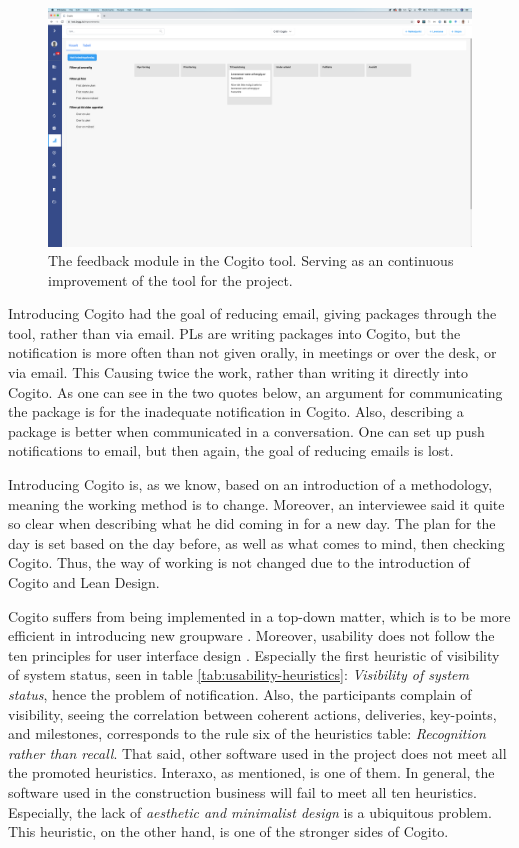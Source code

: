 \begin{figure}
    \centering
    \includegraphics[width=\textwidth]{fig/cogitos_feedback.png}
    \caption{The feedback module in the Cogito tool. Serving as an continuous improvement of the tool for the project.}
    \label{fig:cogito_feedback}
\end{figure}

Introducing Cogito had the goal of reducing email, giving packages through the tool, rather than via email. PLs are writing packages into Cogito, but the notification is more often than not given orally, in meetings or over the desk, or via email. This Causing twice the work, rather than writing it directly into Cogito. As one can see in the two quotes below, an argument for communicating the package is for the inadequate notification in Cogito. Also, describing a package is better when communicated in a conversation. One can set up push notifications to email, but then again, the goal of reducing emails is lost. 

Introducing Cogito is, as we know, based on an introduction of a methodology, meaning the working method is to change. Moreover, an interviewee said it quite so clear when describing what he did coming in for a new day. The plan for the day is set based on the day before, as well as what comes to mind, then checking Cogito. Thus, the way of working is not changed due to the introduction of Cogito and Lean Design.

Cogito suffers from being implemented in a top-down matter, which is to be more efficient in introducing new groupware \citep{Robey&Sahay}. Moreover, usability does not follow the ten principles for user interface design \citep{nielsen199510}. Especially the first heuristic of visibility of system status, seen in table \ref{tab:usability-heuristics}: \textit{Visibility of system status}, hence the problem of notification. Also, the participants complain of visibility, seeing the correlation between coherent actions, deliveries, key-points, and milestones, corresponds to the rule six of the heuristics table: \textit{Recognition rather than recall}. That said, other software used in the project does not meet all the promoted heuristics. Interaxo, as mentioned, is one of them. In general, the software used in the construction business will fail to meet all ten heuristics. Especially, the lack of \textit{aesthetic and minimalist design} is a ubiquitous problem. This heuristic, on the other hand, is one of the stronger sides of Cogito.

